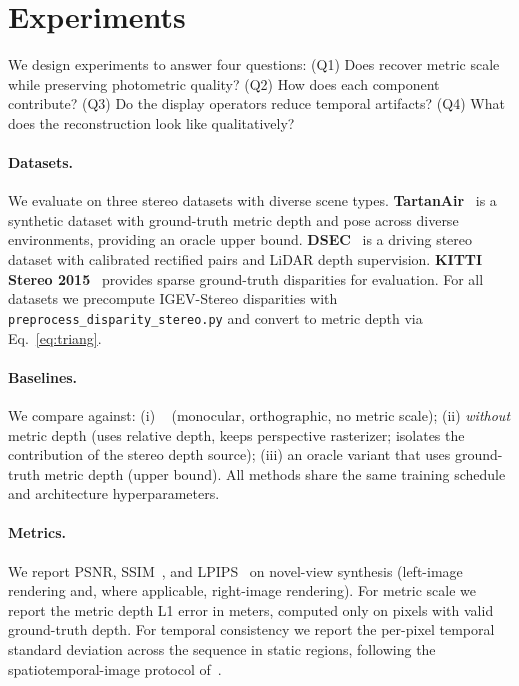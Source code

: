 \section{Experiments}
\label{sec:exp}

We design experiments to answer four questions: (Q1) Does \StereoSplat
recover metric scale while preserving photometric quality? (Q2) How does
each component contribute? (Q3) Do the display operators reduce temporal
artifacts? (Q4) What does the reconstruction look like qualitatively?

\paragraph{Datasets.}
We evaluate on three stereo datasets with diverse scene types.
\textbf{TartanAir}~\cite{wang2020tartanair} is a synthetic dataset with
ground-truth metric depth and pose across diverse environments, providing
an oracle upper bound. \textbf{DSEC}~\cite{gehrig2021dsec} is a driving
stereo dataset with calibrated rectified pairs and LiDAR depth
supervision. \textbf{KITTI Stereo 2015}~\cite{menze2015kitti} provides
sparse ground-truth disparities for evaluation. For all datasets we
precompute IGEV-Stereo disparities with
\texttt{preprocess\_disparity\_stereo.py} and convert to metric depth via
Eq.~\ref{eq:triang}.

\paragraph{Baselines.}
We compare against: (i) \StreamSplat~\cite{wu2026streamsplat} (monocular,
orthographic, no metric scale); (ii) \StereoSplat \emph{without} metric
depth (uses relative depth, keeps perspective rasterizer; isolates the
contribution of the stereo depth source); (iii) an oracle variant that
uses ground-truth metric depth (upper bound). All methods share the same
training schedule and architecture hyperparameters.

\paragraph{Metrics.}
We report PSNR, SSIM~\cite{wang2004ssim}, and LPIPS~\cite{zhang2018lpips}
on novel-view synthesis (left-image rendering and, where applicable,
right-image rendering). For metric scale we report the metric depth L1
error in meters, computed only on pixels with valid ground-truth depth.
For temporal consistency we report the per-pixel temporal standard
deviation across the sequence in static regions, following the
spatiotemporal-image protocol of~\cite{yun2025compensating}.


